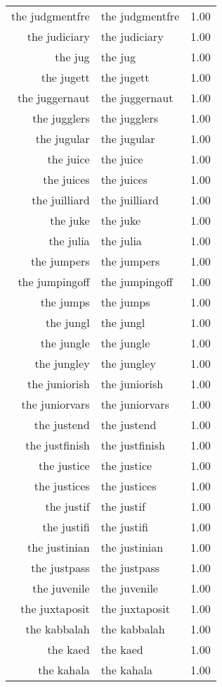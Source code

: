 \begin{table}[ht]
\begin{tabular}{rlr}
  the judgmentfre & the judgmentfre & 1.00 \\ 
  the judiciary & the judiciary & 1.00 \\ 
  the jug & the jug & 1.00 \\ 
  the jugett & the jugett & 1.00 \\ 
  the juggernaut & the juggernaut & 1.00 \\ 
  the jugglers & the jugglers & 1.00 \\ 
  the jugular & the jugular & 1.00 \\ 
  the juice & the juice & 1.00 \\ 
  the juices & the juices & 1.00 \\ 
  the juilliard & the juilliard & 1.00 \\ 
  the juke & the juke & 1.00 \\ 
  the julia & the julia & 1.00 \\ 
  the jumpers & the jumpers & 1.00 \\ 
  the jumpingoff & the jumpingoff & 1.00 \\ 
  the jumps & the jumps & 1.00 \\ 
  the jungl & the jungl & 1.00 \\ 
  the jungle & the jungle & 1.00 \\ 
  the jungley & the jungley & 1.00 \\ 
  the juniorish & the juniorish & 1.00 \\ 
  the juniorvars & the juniorvars & 1.00 \\ 
  the justend & the justend & 1.00 \\ 
  the justfinish & the justfinish & 1.00 \\ 
  the justice & the justice & 1.00 \\ 
  the justices & the justices & 1.00 \\ 
  the justif & the justif & 1.00 \\ 
  the justifi & the justifi & 1.00 \\ 
  the justinian & the justinian & 1.00 \\ 
  the justpass & the justpass & 1.00 \\ 
  the juvenile & the juvenile & 1.00 \\ 
  the juxtaposit & the juxtaposit & 1.00 \\ 
  the kabbalah & the kabbalah & 1.00 \\ 
  the kaed & the kaed & 1.00 \\ 
  the kahala & the kahala & 1.00 \\ 

\end{tabular}
\end{table}
